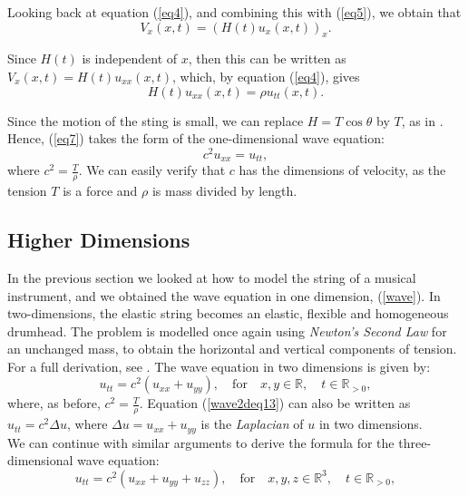 \documentclass[a4paper, 12pt]{article}
\numberwithin{equation}{section}
\begin{document}
Looking back at equation (\ref{eq4}), and combining this with (\ref{eq5}), we
obtain that
\begin{equation*} 
    V_x(x,t)=(H(t)u_x(x,t))_x.
\end{equation*}

Since $H(t)$ is independent of $x$, then this can be written as
$V_x(x,t)=H(t)u_{xx}(x,t)$, which, by equation (\ref{eq4}), gives
\begin {equation} \label{eq7}
    H(t)u_{xx}(x, t)=\rho u_{tt}(x,t).
\end{equation}

Since the motion of the sting is small, we can replace $H=T\cos{\theta}$ by $T$,
as in \cite[Ch. 10, App. B]{BoyDiP}. Hence, (\ref{eq7}) takes the form of the
one-dimensional wave equation:
\begin{equation} \label{wave}
    c^2u_{xx}=u_{tt}, 
\end{equation}
where $c^2=\frac{T}{\rho}$. We can easily verify that $c$ has the dimensions of
velocity, as the tension $T$ is a force and $\rho$ is mass divided by length.

\subsection{Higher Dimensions} \label{twodim}
In the previous section we looked at how to model the string of a musical
instrument, and we obtained the wave equation in one dimension, (\ref{wave}). In
two-dimensions, the elastic string becomes an elastic, flexible and homogeneous
drumhead. The problem is modelled once again using \emph{Newton's Second Law}
for an unchanged mass, to obtain the horizontal and vertical components of
tension. For a full derivation, see \cite[Ch. 12.8]{Kr}. The wave equation in
two dimensions is given by:
\begin{equation} \label{wave2deq13}
    u_{tt}=c^2(u_{xx}+u_{yy}), \quad \textrm{for} \quad x,y \in \mathbb{R}, \quad t \in \mathbb{R}_{>0},
\end{equation}
where, as before, $c^2=\frac{T}{\rho}$. Equation (\ref{wave2deq13}) can also be
written as $u_{tt}=c^2\Delta u$, where $\Delta u=u_{xx}+u_{yy}$ is the
\emph{Laplacian} of $u$ in two dimensions.\\

We can continue with similar arguments to derive the formula for the
three-dimensional wave equation:
\begin {equation} \label{wave3deq14}
    u_{tt}=c^2(u_{xx}+u_{yy}+u_{zz}), \quad \textrm{for}\quad x,y,z \in \mathbb{R}^3, \quad t \in \mathbb{R}_{>0},
\end{equation}
\end{document}
